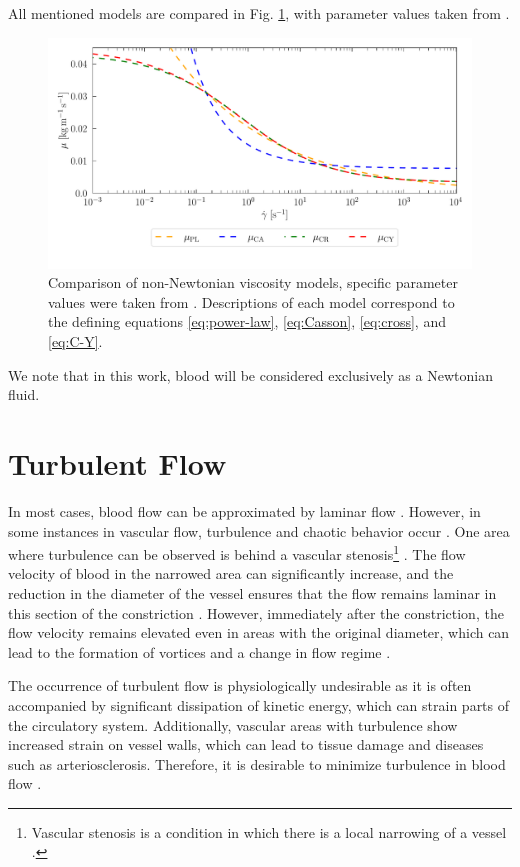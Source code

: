 All mentioned models are compared in Fig. \ref{fig:vs}, with parameter values taken from \cite{Eichler2023}.
\begin{figure}[H]
	\centering
	\includegraphics[width=1.0\textwidth]{figures/modely.pdf}
	\vspace{-9mm}
	\caption{Comparison of non-Newtonian viscosity models, specific parameter values were taken from \cite{Eichler2023}. Descriptions of each model correspond to the defining equations
		\eqref{eq:power-law}, \eqref{eq:Casson}, \eqref{eq:cross}, and \eqref{eq:C-Y}.}
	\label{fig:vs}
\end{figure}
We note that in this work, blood will be considered exclusively as a Newtonian fluid.

\section*{\fontsize{11}{15}\selectfont Turbulent Flow}
In most cases, blood flow can be approximated by laminar flow \cite{Sequeira}. However, in some instances in vascular flow, turbulence and chaotic behavior occur \cite{Saqr2020}. One area where turbulence can be observed is behind a vascular stenosis\footnote{Vascular stenosis is a condition in which there is a local narrowing of a vessel \cite{Carabello2009}.} \cite{Jain2022}. The flow velocity of blood in the narrowed area can significantly increase, and the reduction in the diameter of the vessel ensures that the flow remains laminar in this section of the constriction \cite{Sequeira}. However, immediately after the constriction, the flow velocity remains elevated even in areas with the original diameter, which can lead to the formation of vortices and a change in flow regime \cite{Saloner2019, Varghese2003}.

The occurrence of turbulent flow is physiologically undesirable as it is often accompanied by significant dissipation of kinetic energy, which can strain parts of the circulatory system. Additionally, vascular areas with turbulence show increased strain on vessel walls, which can lead to tissue damage and diseases such as arteriosclerosis. Therefore, it is desirable to minimize turbulence in blood flow \cite{Saloner2019, Kameneva2004}.

